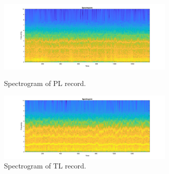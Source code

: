 \documentclass[a4paper,11pt]{article}
\begin{document}

\begin{figure}[ht!]
    \begin{minipage}{0.5\textwidth}
        \centering
        \includegraphics[width=85mm]{PL_sig3_spectrogram.png}
        \caption{Spectrogram of PL record.}
    \end{minipage}\hfill
    \begin{minipage}{0.5\textwidth}
        \centering
        \includegraphics[width=85mm]{TL_sig3_spectrogram.png}
        \caption{Spectrogram of TL record.}
    \end{minipage}\hfill
\end{figure}
\end{document}
